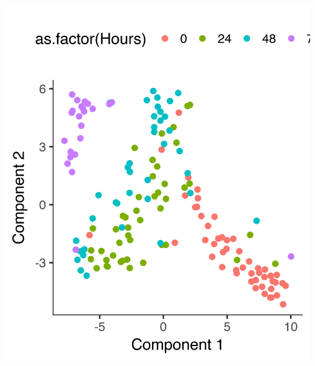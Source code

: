 \documentclass[10pt,oneside]{article}\usepackage[]{graphicx}\usepackage[]{color}
\makeatletter
\def\maxwidth{ %
  \ifdim\Gin@nat@width>\linewidth
    \linewidth
  \else
    \Gin@nat@width
  \fi
}
\newenvironment{knitrout}{}{} %
\makeatother
\begin{document}
\begin{knitrout}
\includegraphics[width=\maxwidth]{figure/check_the_clustering_results-2} 

\end{knitrout}
\end{document}
